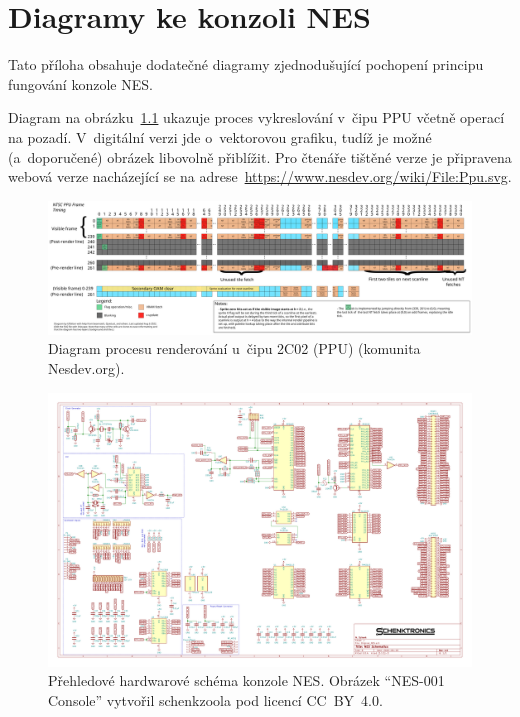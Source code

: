 \chapter{Diagramy ke konzoli NES}
\label{apx:ppu}

Tato příloha obsahuje dodatečné diagramy zjednodušující pochopení principu fungování konzole NES.

Diagram na obrázku~\ref{fig:ppu-renderovani} ukazuje proces vykreslování v~čipu PPU včetně operací na pozadí. V~digitální verzi jde o~vektorovou grafiku, tudíž je možné (a~doporučené) obrázek libovolně přiblížit. Pro čtenáře tištěné verze je připravena webová verze nacházející se na adrese~\url{https://www.nesdev.org/wiki/File:Ppu.svg}.

\begin{figure}[p]
	\centering
	\includegraphics[width=0.98\textheight, angle=270]{images/ppudiag.pdf}
	\caption{Diagram procesu renderování u~čipu 2C02 (PPU) (komunita Nesdev.org).}
	\label{fig:ppu-renderovani}
\end{figure}

\begin{figure}[p]
	\centering
	\includegraphics[width=0.92\textheight, angle=270]{images/NES-001.pdf}
	\caption{Přehledové hardwarové schéma konzole NES. Obrázek \enquote{NES-001 Console} vytvořil schenkzoola pod licencí CC~BY~4.0.}
	\label{fig:nes001-hw}
\end{figure}

